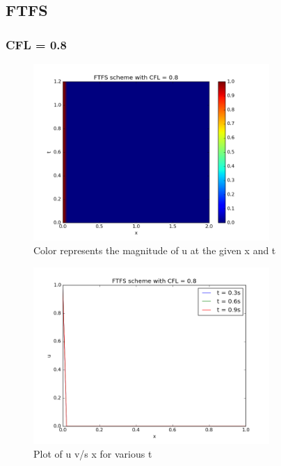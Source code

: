 \documentclass[11pt, a4paper]{article}
\begin{document}
\subsection{FTFS}
\subsubsection{CFL = 0.8}
\begin{figure}[H]
 \centering
 \includegraphics[width = 0.8\textwidth]{FTFS1_08.png}
 \caption{Color represents the magnitude of u at the given x and t}
\end{figure}

\begin{figure}[H]
 \centering
 \includegraphics[width = 0.8\textwidth]{FTFS1_08_1.png}
 \caption{Plot of u v/s x for various t}
\end{figure}
\end{document}
